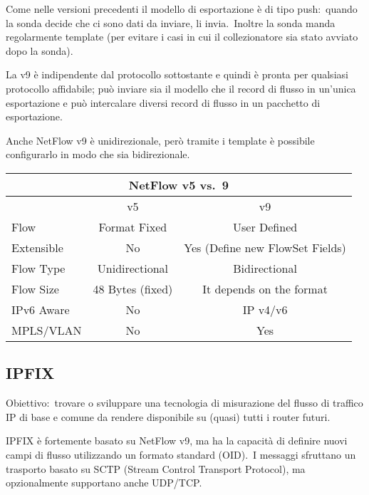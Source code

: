 Come nelle versioni precedenti il modello di esportazione è di tipo push:\ quando la sonda decide che ci sono dati da inviare, li invia.\
Inoltre la sonda manda regolarmente template (per evitare i casi in cui il collezionatore sia stato avviato dopo la sonda).\

La v9 è indipendente dal protocollo sottostante e quindi è pronta per qualsiasi protocollo affidabile; può inviare sia il modello che il record di flusso in un'unica esportazione e può intercalare diversi record di flusso in un pacchetto di esportazione.\

Anche NetFlow v9 è unidirezionale, però tramite i template è possibile configurarlo in modo che sia bidirezionale.

\begin{table}[H]
    \centering
    \begin{tabular}{|l|c|c|}

        \multicolumn{3}{c}{\textbf{NetFlow v5 vs.\ 9}}                   \\\hline
                   & v5               & v9                               \\\hline
        Flow       & Format Fixed     & User Defined                     \\
        Extensible & No               & Yes (Define new  FlowSet Fields) \\
        Flow Type  & Unidirectional   & Bidirectional                    \\
        Flow Size  & 48 Bytes (fixed) & It depends on the format         \\
        IPv6 Aware & No               & IP v4/v6                         \\
        MPLS/VLAN  & No               & Yes                              \\\hline
    \end{tabular}
\end{table}

\subsection{IPFIX}

Obiettivo:\ trovare o sviluppare una tecnologia di misurazione del flusso di traffico IP di base e comune da rendere disponibile su (quasi) tutti i router futuri.\

IPFIX è fortemente basato su NetFlow v9, ma ha la capacità di definire nuovi campi di flusso utilizzando un formato standard (OID).\
I messaggi sfruttano un trasporto basato su SCTP (Stream Control Transport Protocol), ma opzionalmente supportano anche UDP/TCP.\

